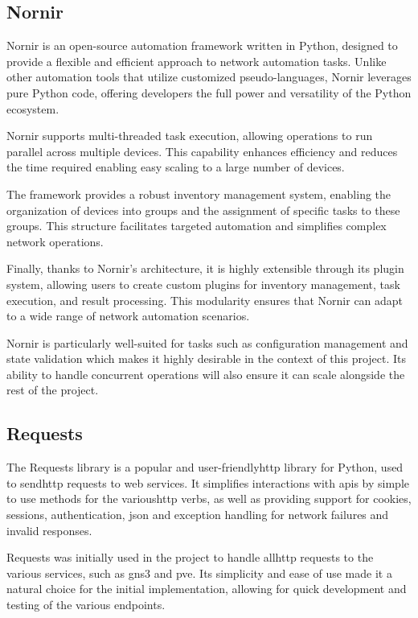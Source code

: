 \subsection{Nornir}
Nornir is an open-source automation framework written in Python, designed to provide a flexible and efficient 
approach to network automation tasks\cite{nornir2025}. Unlike other automation tools that utilize customized 
pseudo-languages, Nornir leverages pure Python code, offering developers the full power and versatility of the Python 
ecosystem.

Nornir supports multi-threaded task execution, allowing operations to run parallel across multiple devices.
This capability enhances efficiency and reduces the time required enabling easy scaling to a large number of devices.

The framework provides a robust inventory management system, enabling the organization of devices into groups and the 
assignment of specific tasks to these groups. This structure facilitates targeted automation and simplifies complex 
network operations.

Finally, thanks to Nornir's architecture, it is highly extensible through its plugin system, allowing users to create 
custom plugins for inventory management, task execution, and result processing. This modularity ensures that Nornir can 
adapt to a wide range of network automation scenarios.

Nornir is particularly well-suited for tasks such as configuration management and state validation which makes it 
highly desirable in the context of this project. Its ability to handle concurrent operations will also ensure it can scale 
alongside the rest of the project.

\subsection{Requests}
The Requests\cite{requests2025} library is a popular and user-friendly\ac{http} library for Python, used to send\ac{http} 
requests to web services. It simplifies interactions with \ac{api}s by simple to use methods for the various\ac{http} verbs, 
as well as providing support for cookies, sessions, authentication, \ac{json} and exception handling for network failures and 
invalid responses.

Requests was initially used in the project to handle all\ac{http} requests to the various services, such as
\ac{gns3} and \ac{pve}. Its simplicity and ease of use made it a natural choice for the initial implementation, allowing
for quick development and testing of the various endpoints.

